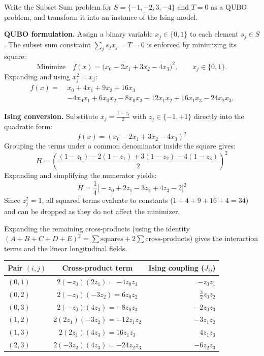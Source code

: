 \documentclass{ceri/sty/rapport}
\newcounter{exercice}[section]
\begin{document}
\begin{exercice}[p.~109]
Write the Subset Sum problem for $S = \{-1, -2, 3, -4\}$ and $T = 0$ as a QUBO problem,
and transform it into an instance of the Ising model.
\end{exercice}

\begin{solution}
\textbf{QUBO formulation.}
Assign a binary variable $x_j \in \{0,1\}$ to each element $s_j \in S$.
The subset sum constraint $\sum_j s_j x_j = T = 0$ is enforced by minimizing its square:
\[
  \text{Minimize}\quad f(x) = \bigl(x_0 - 2x_1 + 3x_2 - 4x_3\bigr)^2,
  \qquad x_j \in \{0,1\}.
\]
Expanding and using $x_j^2 = x_j$:
\begin{align*}
  f(x) =\; & x_0 + 4x_1 + 9x_2 + 16x_3 \\
           & - 4x_0x_1 + 6x_0x_2 - 8x_0x_3 - 12x_1x_2 + 16x_1x_3 - 24x_2x_3.
\end{align*}

\textbf{Ising conversion.}
Substitute $x_j = \tfrac{1-z_j}{2}$ with $z_j \in \{-1,+1\}$ directly into the quadratic form:
\[
  f(x) = (x_0 - 2x_1 + 3x_2 - 4x_3)^2
\]
Grouping the terms under a common denominator inside the square gives:
\[
  H = \left( \frac{(1 - z_0) - 2(1 - z_1) + 3(1 - z_2) - 4(1 - z_3)}{2} \right)^2
\]
Expanding and simplifying the numerator yields:
\[
  H = \frac{1}{4} \Big[ -z_0 + 2z_1 - 3z_2 + 4z_3 - 2 \Big]^2
\]
Since $z_j^2 = 1$, all squared terms evaluate to constants ($1 + 4 + 9 + 16 + 4 = 34$) and can be dropped as they do not affect the minimizer. 

Expanding the remaining cross-products (using the identity $(A+B+C+D+E)^2 = \sum \text{squares} + 2\sum \text{cross-products}$) gives the interaction terms and the linear longitudinal fields.

\medskip
\begin{center}
\renewcommand{\arraystretch}{1.3}
\begin{tabular}{lcr}
  \textbf{Pair $(i,j)$} & \textbf{Cross-product term} & \textbf{Ising coupling} ($J_{ij}$) \\
  \hline
  $(0,1)$ & $2(-z_0)(2z_1) = -4z_0z_1$   & $-z_0z_1$   \\
  $(0,2)$ & $2(-z_0)(-3z_2) = 6z_0z_2$   & $\tfrac{3}{2}z_0z_2$  \\
  $(0,3)$ & $2(-z_0)(4z_3) = -8z_0z_3$   & $-2z_0z_3$   \\
  $(1,2)$ & $2(2z_1)(-3z_2) = -12z_1z_2$ & $-3z_1z_2$   \\
  $(1,3)$ & $2(2z_1)(4z_3) = 16z_1z_3$   & $4z_1z_3$    \\
  $(2,3)$ & $2(-3z_2)(4z_3) = -24z_2z_3$ & $-6z_2z_3$   \\
\end{tabular}
\end{center}


\end{solution}
\end{document}
